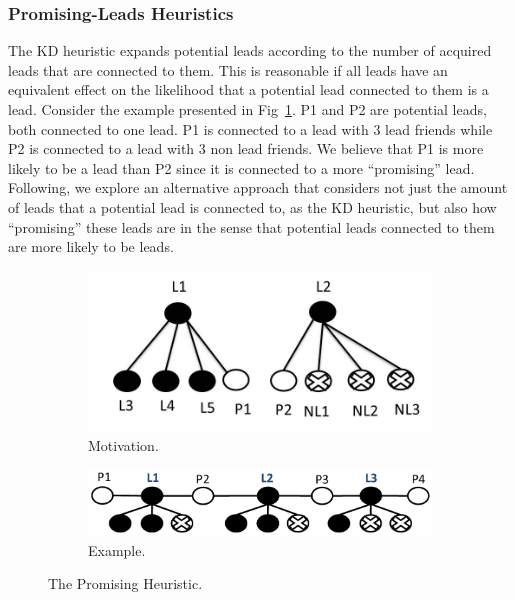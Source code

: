\documentclass[journal]{IEEEtran}
\begin{document}
\subsubsection{Promising-Leads Heuristics}
\label{sec:promising}

The KD heuristic expands potential leads according to the number of acquired leads that are connected to them. This is reasonable if all leads have an equivalent effect on the likelihood that a potential lead connected to them is a lead.
Consider the example presented in Fig~\ref{fig:PromiseMotivation}. P1 and P2 are potential leads, both connected to one lead. P1 is connected to a lead with 3 lead friends while P2 is connected to a lead with 3 non lead friends. 
We believe that P1 is more likely to be a lead than P2 since it is connected to a more ``promising'' lead.
 Following, we explore an alternative approach that considers not just the amount of leads that a potential lead is connected to, as the KD heuristic, but also how ``promising'' these leads are %
 in the sense that potential leads connected to them are more likely to be leads. 

\begin{figure}
\centering
\begin{subfigure}{0.35\linewidth}
  \centering
  \includegraphics[width=\linewidth]{PromiseMotivation.jpg}
   \caption{Motivation.}\label{fig:PromiseMotivation}
\end{subfigure}
\begin{subfigure}{0.55\linewidth}
  \centering
  \includegraphics[width=\linewidth]{bysp-good_cropped.pdf}
   \caption{Example.}\label{fig:Promising}
\end{subfigure}
\caption{The Promising Heuristic.}
\end{figure}
\end{document}

